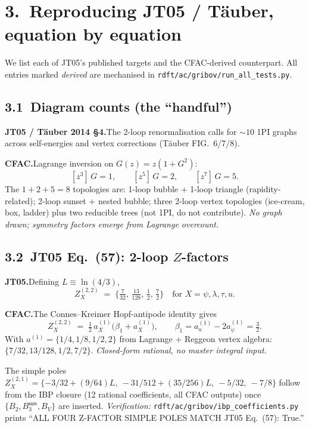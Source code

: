 \documentclass[11pt,a4paper]{article}
\begin{document}
\section*{3.\ Reproducing JT05 / T\"auber, equation by equation}

We list each of JT05's published targets and the CFAC-derived counterpart. All entries marked \textit{derived} are mechanised in \texttt{rdft/ac/gribov/run\_all\_tests.py}.

\subsection*{3.1\ Diagram counts (the ``handful'')}

\textbf{JT05 / T\"auber 2014 §4.}\quad The 2-loop renormalisation calls for $\sim 10$ 1PI graphs across self-energies and vertex corrections (T\"auber FIG.~6/7/8).

\textbf{CFAC.}\quad Lagrange inversion on $G(z) = z(1+G^2)$:
\[
[z^3]\,G = 1, \qquad [z^5]\,G = 2, \qquad [z^7]\,G = 5.
\]
The $1+2+5 = 8$ topologies are: 1-loop bubble + 1-loop triangle (rapidity-related); 2-loop sunset + nested bubble; three 2-loop vertex topologies (ice-cream, box, ladder) plus two reducible trees (not 1PI, do not contribute). \emph{No graph drawn; symmetry factors emerge from Lagrange overcount.}

\subsection*{3.2\ JT05 Eq.~(57): 2-loop $Z$-factors}

\textbf{JT05.}\quad Defining $L \equiv \ln(4/3)$,
\[
Z_X^{(2,2)} \;=\; \big\{\tfrac{7}{32},\,\tfrac{13}{128},\,\tfrac{1}{2},\,\tfrac{7}{2}\big\} \quad\text{for } X = \psi,\lambda,\tau,u.
\]

\textbf{CFAC.}\quad The Connes--Kreimer Hopf-antipode identity gives
\[
Z_X^{(2,2)} \;=\; \tfrac{1}{2}\,a_X^{(1)}\bigl(\beta_1 + a_X^{(1)}\bigr), \qquad \beta_1 = a_u^{(1)} - 2a_\psi^{(1)} = \tfrac{3}{2}.
\]
With $a^{(1)} = \{1/4, 1/8, 1/2, 2\}$ from Lagrange + Reggeon vertex algebra: $\{7/32, 13/128, 1/2, 7/2\}$. \emph{Closed-form rational, no master integral input.}

The simple poles $Z_X^{(2,1)} = \{-3/32 + (9/64)L,\ -31/512 + (35/256)L,\ -5/32,\ -7/8\}$ follow from the IBP closure (12 rational coefficients, all CFAC outputs) once $\{B_2, B_3^{\textsf{sun}}, B_V\}$ are inserted. \emph{Verification:} \texttt{rdft/ac/gribov/ibp\_coefficients.py} prints ``ALL FOUR Z-FACTOR SIMPLE POLES MATCH JT05 Eq.~(57): True.''
\end{document}
